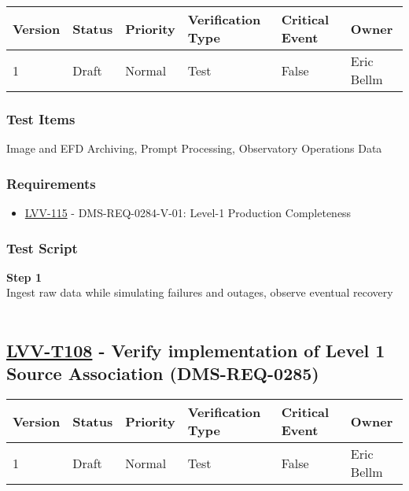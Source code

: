 \begin{longtable}[]{@{}llllll@{}}
\toprule
Version & Status & Priority & Verification Type & Critical Event &
Owner\tabularnewline
\midrule
\endhead
1 & Draft & Normal & Test & False & Eric Bellm\tabularnewline
\bottomrule
\end{longtable}

\hypertarget{test-items-83}{%
\subsubsection{Test Items}\label{test-items-83}}

Image and EFD Archiving, Prompt Processing, Observatory Operations Data~

\hypertarget{requirements-84}{%
\subsubsection{Requirements}\label{requirements-84}}

\begin{itemize}
\tightlist
\item
  \href{https://jira.lsstcorp.org/browse/LVV-115}{LVV-115} -
  DMS-REQ-0284-V-01: Level-1 Production Completeness
\end{itemize}

\hypertarget{test-script-84}{%
\subsubsection{Test Script}\label{test-script-84}}

\textbf{Step 1}\\
Ingest raw data while simulating failures and outages, observe eventual
recovery\\
~\\

\hypertarget{lvv-t108---verify-implementation-of-level-1-source-association-dms-req-0285}{%
\subsection{\texorpdfstring{\href{https://jira.lsstcorp.org/secure/Tests.jspa\#/testCase/LVV-T108}{LVV-T108}
- Verify implementation of Level 1 Source Association
(DMS-REQ-0285)}{LVV-T108 - Verify implementation of Level 1 Source Association (DMS-REQ-0285)}}\label{lvv-t108---verify-implementation-of-level-1-source-association-dms-req-0285}}

\begin{longtable}[]{@{}llllll@{}}
\toprule
Version & Status & Priority & Verification Type & Critical Event &
Owner\tabularnewline
\midrule
\endhead
1 & Draft & Normal & Test & False & Eric Bellm\tabularnewline
\bottomrule
\end{longtable}

